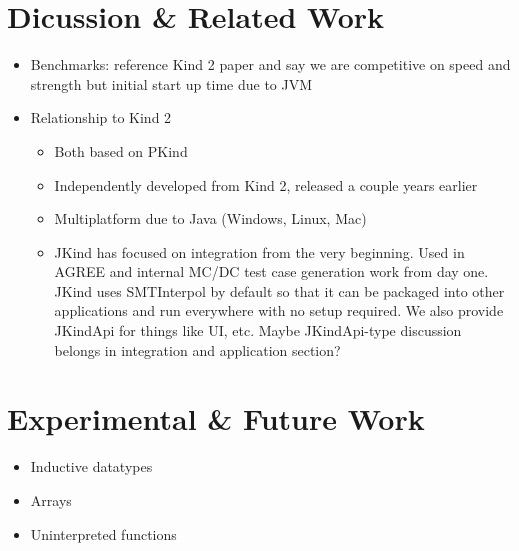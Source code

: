 \documentclass{llncs}
\begin{document}
\section{Dicussion \& Related Work}

\begin{itemize}
\item Benchmarks: reference Kind 2 paper and say we are competitive on
  speed and strength but initial start up time due to JVM
\item Relationship to Kind 2~\cite{champion2016cav}
  \begin{itemize}
  \item Both based on PKind
  \item Independently developed from Kind 2, released a couple years earlier
  \item Multiplatform due to Java (Windows, Linux, Mac)
  \item JKind has focused on integration from the very beginning. Used
    in AGREE and internal MC/DC test case generation work from day
    one. JKind uses SMTInterpol by default so that it can be packaged
    into other applications and run everywhere with no setup required.
    We also provide JKindApi for things like UI, etc. Maybe
    JKindApi-type discussion belongs in integration and application
    section?
  \end{itemize}
\end{itemize}

\section{Experimental \& Future Work}

\begin{itemize}
\item Inductive datatypes
\item Arrays
\item Uninterpreted functions
\end{itemize}

{}

\end{document}
